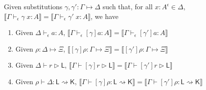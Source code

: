 \documentclass[acmsmall,screen,review]{acmart}
\newcommand{\ms}[1]{\ensuremath{\mathsf{#1}}}
\newcommand{\thyp}[3]{#1 : {#2}^{#3}}
\newcommand{\hasty}[4]{#1 \vdash_{#2} #3: {#4}}
\newcommand{\haslb}[3]{#1 \vdash #2 \rhd #3}
\newcommand{\issubst}[3]{#1: #2 \mapsto #3}
\newcommand{\lbsubst}[4]{#1 \vdash #2: #3 \rightsquigarrow #4}
\newcommand{\dnt}[1]{\llbracket{#1}\rrbracket}
\begin{document}
\begin{theorem}
  Given substitutions $\issubst{\gamma, \gamma'}{\Gamma}{\Delta}$ such that, for all 
  $\thyp{x}{A}{\epsilon} \in \Delta$, $\dnt{\hasty{\Gamma}{\epsilon}{\gamma\;x}{A}} =
  \dnt{\hasty{\Gamma}{\epsilon}{\gamma'\;x}{A}}$, we have
  \begin{enumerate}[label=(\alph*)]
    \item Given $\hasty{\Delta}{\epsilon}{a}{A}$, 
      $\dnt{\hasty{\Gamma}{\epsilon}{[\gamma]a}{A}} = \dnt{\hasty{\Gamma}{\epsilon}{[\gamma']a}{A}}$
    \item Given $\issubst{\rho}{\Delta}{\Xi}$, $\dnt{\issubst{[\gamma]\rho}{\Gamma}{\Xi}} =
      \dnt{\issubst{[\gamma']\rho}{\Gamma}{\Xi}}$
    \item Given $\haslb{\Delta}{r}{\ms{L}}$, $\dnt{\haslb{\Gamma}{[\gamma]r}{\ms{L}}} =
      \dnt{\haslb{\Gamma}{[\gamma']r}{\ms{L}}}$
    \item Given $\lbsubst{\rho}{\Delta}{\ms{L}}{\ms{K}}$,
      $\dnt{\lbsubst{\Gamma}{[\gamma]\rho}{\ms{L}}{\ms{K}}} =
      \dnt{\lbsubst{\Gamma}{[\gamma']\rho}{\ms{L}}{\ms{K}}}$ 
  \end{enumerate}
  \label{thm:rewriting}
\end{theorem}
\end{document}
